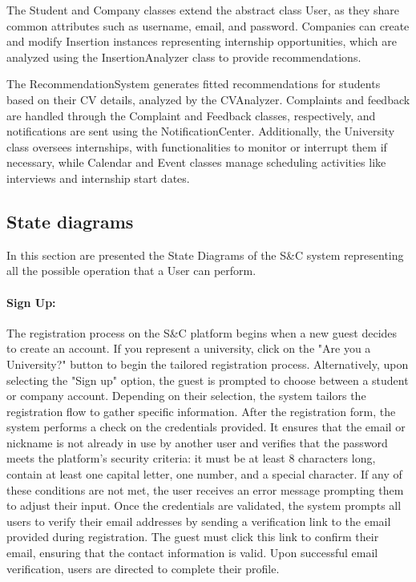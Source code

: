 The Student and Company classes extend the abstract class User, as they share common attributes such as username, email, and password. Companies can create and modify Insertion instances representing internship opportunities, which are analyzed using the InsertionAnalyzer class to provide recommendations.

The RecommendationSystem generates fitted recommendations for students based on their CV details, analyzed by the CVAnalyzer. Complaints and feedback are handled through the Complaint and Feedback classes, respectively, and notifications are sent using the NotificationCenter. Additionally, the University class oversees internships, with functionalities to monitor or interrupt them if necessary, while Calendar and Event classes manage scheduling activities like interviews and internship start dates.


\subsection{State diagrams}
\label{subsec:state_diagrams}%

In this section are presented the State Diagrams of the S\&C system
representing all the possible operation that a User can perform.

\paragraph{Sign Up:} The registration process on the S\&C platform begins
  when a new guest decides to create an account. If you represent a
  university, click on the "Are you a
  University?" button to begin the tailored
  registration process. Alternatively, upon selecting the "Sign up"
  option, the guest is prompted to choose between a student or company
  account. Depending on their selection, the system tailors the
  registration flow to gather specific information. After the
  registration form, the system performs a check on the credentials
  provided. It ensures that the email or nickname is not already in use
  by another user and verifies that the password meets the platform's
  security criteria: it must be at least 8 characters long, contain at
  least one capital letter, one number, and a special character. If any
  of these conditions are not met, the user receives an error message
  prompting them to adjust their input. Once the credentials are
  validated, the system prompts all users to verify their email
  addresses by sending a verification link to the email provided during
  registration. The guest must click this link to confirm their email,
  ensuring that the contact information is valid. Upon successful email
  verification, users are directed to complete their profile.

